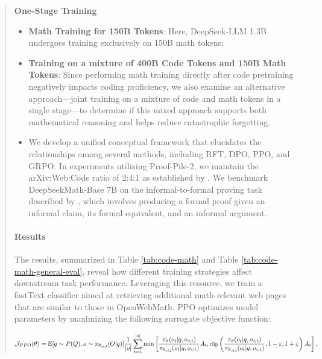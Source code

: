 \begin{abstract}
\textbf{One-Stage Training}

\begin{itemize}[topsep=0pt]
    \item \textbf{Math Training for 150B Tokens}: Here, DeepSeek-LLM 1.3B undergoes training exclusively on 150B math tokens;
    \item \textbf{Training on a mixture of 400B Code Tokens and 150B Math Tokens}: Since performing math training directly after code pretraining negatively impacts coding proficiency, we also examine an alternative approach—joint training on a mixture of code and math tokens in a single stage—to determine if this mixed approach supports both mathematical reasoning and helps reduce catastrophic forgetting. \item We develop a unified conceptual framework that elucidates the relationships among several methods, including RFT, DPO, PPO, and GRPO. In experiments utilizing Proof-Pile-2, we maintain the arXiv:Web:Code ratio of 2:4:1 as established by \cite{llemma}. We benchmark DeepSeekMath-Base 7B on the informal-to-formal proving task described by \citep{dsp_proof}, which involves producing a formal proof given an informal claim, its formal equivalent, and an informal argument. \end{itemize}

\paragraph{Results}
The results, summarized in Table \ref{tab:code-math} and Table \ref{tab:code-math-general-eval}, reveal how different training strategies affect downstream task performance. Leveraging this resource, we train a fastText classifier \citep{joulin2016fasttext} aimed at retrieving additional math-relevant web pages that are similar to those in OpenWebMath. PPO optimizes model parameters by maximizing the following surrogate objective function:

\begin{equation}
\footnotesize
        \mathcal{J}_{PPO}(\theta) = \mathbb{E}{[q \sim P(Q), o \sim \pi_{\theta_{old}}(O|q)]} \frac{1}{|o|} \sum_{t=1}^{|o|} \min \left[ \frac{\pi_\theta(o_{t} | q, o_{<t})}{\pi_{\theta_{old}}(o_{t} | q, o_{<t})} A_{t}, \text{clip} \left( \frac{\pi_\theta(o_{t} | q, o_{<t})}{\pi_{\theta_{old}}(o_{t} | q, o_{<t})}, 1 - \varepsilon, 1 + \varepsilon \right)  A_{t} \right] ,
\end{equation}


\end{abstract}
